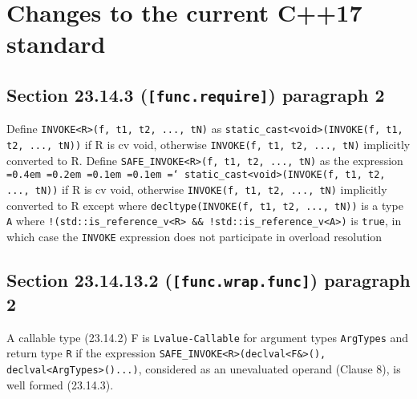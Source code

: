 \documentclass{article}
\newcommand*\justify{%
  \fontdimen2\font=0.4em%
  \fontdimen3\font=0.2em%
  \fontdimen4\font=0.1em%
  \fontdimen7\font=0.1em%
  \hyphenchar\font=`\-%
}
\begin{document}
\section{Changes to the current C++17 standard}
\subsection{Section 23.14.3 (\texttt{[func.require]}) paragraph 2}
Define \texttt{INVOKE<R>(f, t1, t2, ..., tN)} as
\texttt{static\_cast<void>(INVOKE(f, t1, t2, ..., tN))} if R is cv void,
otherwise \texttt{INVOKE(f, t1, t2, ..., tN)} implicitly converted to R.
Define \texttt{SAFE\_INVOKE<R>(f, t1, t2, ..., tN)} as the expression
\texttt{\justify static\_cast<void>(INVOKE(f, t1, t2, ..., tN))} if R is cv
void, otherwise \texttt{INVOKE(f, t1, t2, ..., tN)} implicitly converted to R
except where \texttt{decltype(INVOKE(f, t1, t2, ..., tN))} is a type
\texttt{A} where \texttt{!(std::is\_reference\_v<R> \&\&
!std::is\_reference\_v<A>)} is \texttt{true}, in which case the
\texttt{INVOKE} expression does not participate in overload resolution

\subsection{Section 23.14.13.2 (\texttt{[func.wrap.func]}) paragraph 2}
A callable type (23.14.2) F is \texttt{Lvalue-Callable} for argument types
\texttt{ArgTypes} and return type \texttt{R} if the expression
\texttt{SAFE\_INVOKE<R>(declval<F&>(), declval<ArgTypes>()...)}, considered as
an unevaluated operand (Clause 8), is well formed (23.14.3).
\end{document}
